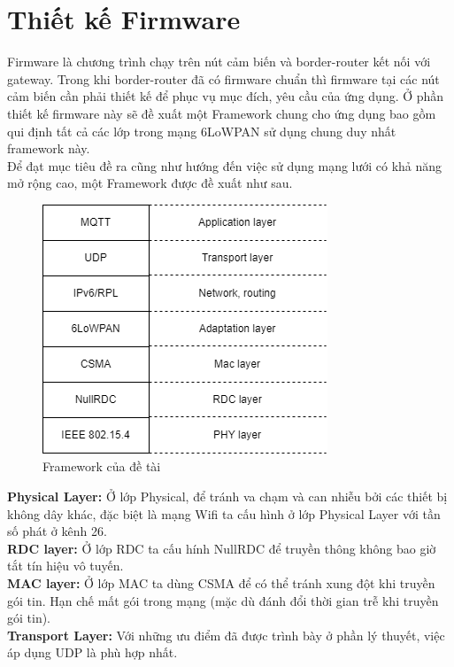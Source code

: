 \documentclass{report}
\begin{document}
\section{Thiết kế Firmware}
Firmware là chương trình chạy trên nút cảm biến và border-router kết nối với gateway. Trong
khi border-router đã có firmware chuẩn thì firmware tại các nút cảm biến cần phải thiết
kế để phục vụ mục đích, yêu cầu của ứng dụng. Ở phần thiết kế firmware này sẽ đề xuất một
Framework chung cho ứng dụng bao gồm qui định tất cả các lớp trong mạng 6LoWPAN sử
dụng chung duy nhất framework này. \\

Để đạt mục tiêu đề ra cũng như hướng đến việc sử dụng mạng lưới có khả năng mở rộng
cao, một Framework được đề xuất như sau. 
\newpage
\begin{figure}[h]
	\centering
	\includegraphics[scale = 0.7]{fig47.png}
	\caption{Framework của đề tài}
	\label{fig:Graph47}
\end{figure}

\textbf{Physical Layer:} Ở lớp Physical, để tránh va chạm và can nhiễu bởi các thiết bị không dây khác, đặc biệt là mạng Wifi ta cấu hình ở lớp Physical Layer với tần số phát ở kênh 26. \\

\textbf{RDC layer:} Ở lớp RDC ta cấu hính NullRDC để truyền thông không bao giờ tắt tín hiệu vô tuyến. \\

\textbf{MAC layer:} Ở lớp MAC ta dùng CSMA để có thể tránh xung đột khi truyền gói tin. Hạn chế mất gói
trong mạng (mặc dù đánh đổi thời gian trễ khi truyền gói tin). \\

\textbf{Transport Layer:} Với những ưu điểm đã được trình bày ở phần lý thuyết, việc áp dụng UDP là phù hợp nhất. \\
\end{document}
